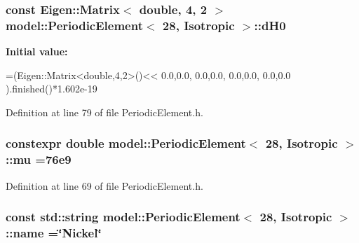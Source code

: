 \subsubsection[{d\+H0}]{\setlength{\rightskip}{0pt plus 5cm}const Eigen\+::\+Matrix$<$ double, 4, 2 $>$ {\bf model\+::\+Periodic\+Element}$<$ 28, {\bf Isotropic} $>$\+::d\+H0\hspace{0.3cm}{\ttfamily [static]}}\label{structmodel_1_1_periodic_element_3_0128_00_01_isotropic_01_4_ab09436c24936ea92ccda9c38d977074a}
{\bfseries Initial value\+:}
\begin{DoxyCode}
=(Eigen::Matrix<double,4,2>()<<
                                                                        0.0,0.0,
                                                                        0.0,0.0,
                                                                        0.0,0.0,
                                                                        0.0,0.0
                                                                        ).finished()*1.602e-19
\end{DoxyCode}


Definition at line 79 of file Periodic\+Element.\+h.

\hypertarget{structmodel_1_1_periodic_element_3_0128_00_01_isotropic_01_4_aaa03f309cce74500979a318c0b04d7f2}{}
\subsubsection[{mu}]{\setlength{\rightskip}{0pt plus 5cm}constexpr double {\bf model\+::\+Periodic\+Element}$<$ 28, {\bf Isotropic} $>$\+::mu =76e9\hspace{0.3cm}{\ttfamily [static]}}\label{structmodel_1_1_periodic_element_3_0128_00_01_isotropic_01_4_aaa03f309cce74500979a318c0b04d7f2}


Definition at line 69 of file Periodic\+Element.\+h.

\hypertarget{structmodel_1_1_periodic_element_3_0128_00_01_isotropic_01_4_acf25c57f664e8fa8f5170698d2d8f50a}{}
\subsubsection[{name}]{\setlength{\rightskip}{0pt plus 5cm}const std\+::string {\bf model\+::\+Periodic\+Element}$<$ 28, {\bf Isotropic} $>$\+::name =\char`\"{}Nickel\char`\"{}\hspace{0.3cm}{\ttfamily [static]}}\label{structmodel_1_1_periodic_element_3_0128_00_01_isotropic_01_4_acf25c57f664e8fa8f5170698d2d8f50a}


